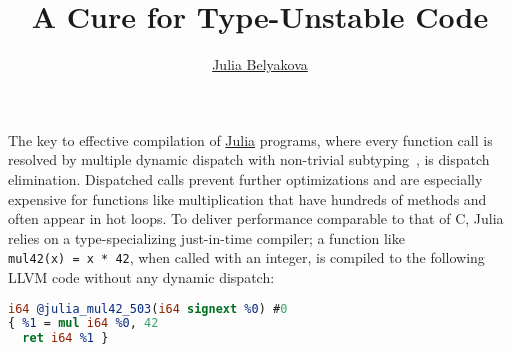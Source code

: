 \documentclass[twocolumn]{article}
\title{A Cure for Type-Unstable Code}\label{a-cure-for-type-unstable-code}
\author{\href{https://julbinb.github.io/}{Julia Belyakova}}
\date{}%
\begin{document}
\maketitle




The key to effective compilation of \href{https://julialang.org/}{Julia}
programs, where every function call is resolved by multiple dynamic dispatch
with non-trivial subtyping~\cite{subtyping},
is dispatch elimination.
Dispatched calls prevent further optimizations and are especially expensive
for functions like multiplication that have hundreds of methods
and often appear in hot loops.
To deliver performance comparable to that of C, Julia relies on
a type-specializing just-in-time compiler; a function like
\texttt{mul42(x)\ =\ x\ *\ 42},
when called with an integer, is compiled to the following
LLVM code without any dynamic dispatch:
\begin{lstlisting}[language=LLVM]
i64 @julia_mul42_503(i64 signext %0) #0
{ %1 = mul i64 %0, 42
  ret i64 %1 }
\end{lstlisting}

\end{document}
